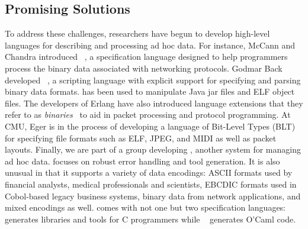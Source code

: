 \subsection{Promising Solutions}

To address these challenges, 
researchers have begun to develop high-level languages 
for describing and processing ad hoc data.  For instance,
McCann and Chandra introduced
\packettypes{}~\cite{sigcomm00}, a specification language designed to help 
programmers process the binary data associated
with networking protocols.  Godmar Back developed
\datascript{}~\cite{gpce02}, a scripting language with explicit
support for specifying and parsing binary data formats. \datascript{}
has been used to manipulate Java jar files and ELF object files.  The
developers of Erlang have also introduced language extensions that
they refer to as {\em binaries}~\cite{erlang-bits,gustafsson+:binaries} 
to aid in packet
processing and protocol programming.  At CMU, Eger is in the process
of developing a
language of Bit-Level Types (BLT)~\cite{eger:blt} for specifying file
formats such as ELF, JPEG, and MIDI as well as packet layouts.
Finally, we are part of a group developing
\pads{}, another system for managing ad hoc data.
\pads{} focuses on robust error handling and tool generation.
It is also unusual in that it supports a variety of data encodings:
ASCII formats used by financial analysts, medical professionals and scientists,
EBCDIC formats used in Cobol-based legacy business systems,
binary data from network applications, and mixed encodings as well.
\pads{} comes with not one but two specification languages: 
\padsc{}~\cite{fisher+:pads} generates
libraries and tools for C programmers while \padsml~\cite{mandelbaum+:padsml}
generates O'Caml code.



